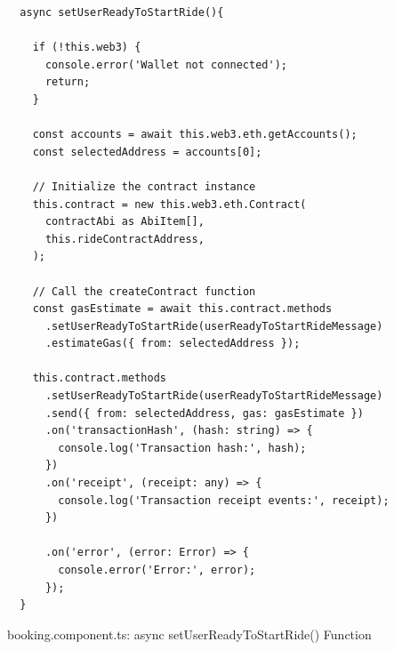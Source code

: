 


\begin{Listing}
\begin{lstlisting}
  async setUserReadyToStartRide(){

    if (!this.web3) {
      console.error('Wallet not connected');
      return;
    }

    const accounts = await this.web3.eth.getAccounts();
    const selectedAddress = accounts[0];

    // Initialize the contract instance
    this.contract = new this.web3.eth.Contract(
      contractAbi as AbiItem[],
      this.rideContractAddress,
    );

    // Call the createContract function
    const gasEstimate = await this.contract.methods
      .setUserReadyToStartRide(userReadyToStartRideMessage)
      .estimateGas({ from: selectedAddress });

    this.contract.methods
      .setUserReadyToStartRide(userReadyToStartRideMessage)
      .send({ from: selectedAddress, gas: gasEstimate })
      .on('transactionHash', (hash: string) => {
        console.log('Transaction hash:', hash);
      })
      .on('receipt', (receipt: any) => {
        console.log('Transaction receipt events:', receipt);
      })

      .on('error', (error: Error) => {
        console.error('Error:', error);
      });
  }
\end{lstlisting}
  \caption{booking.component.ts:   async setUserReadyToStartRide() Function}
  \label{lst:setUserReadyToStartRide}
\end{Listing}

